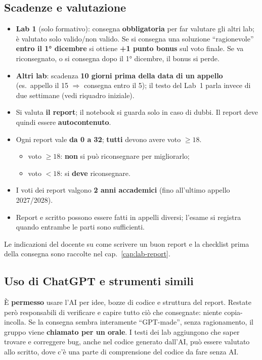 \subsection{Scadenze e valutazione}
\begin{itemize}
  \item \textbf{Lab 1} (solo formativo): consegna \textbf{obbligatoria} per far valutare gli altri lab;
        è valutato solo valido/non valido. Se si consegna una soluzione ``ragionevole''
        \textbf{entro il 1° dicembre} si ottiene \textbf{+1 punto bonus} sul voto finale.
        Se va riconsegnato, o si consegna dopo il 1° dicembre, il bonus si perde.
  \item \textbf{Altri lab}: scadenza \textbf{10 giorni prima della data di un appello} (es.\ appello
        il 15 $\Rightarrow$ consegna entro il 5); il testo del Lab~1 parla invece di due settimane
        (vedi riquadro iniziale).
  \item Si valuta \textbf{il report}; il notebook si guarda solo in caso di dubbi. Il report deve
        quindi essere \textbf{autocontenuto}.
  \item Ogni report vale \textbf{da 0 a 32}; \textbf{tutti} devono avere voto $\geq 18$.
        \begin{itemize}
          \item voto $\geq 18$: \textbf{non} si può riconsegnare per migliorarlo;
          \item voto $< 18$: si \textbf{deve} riconsegnare.
        \end{itemize}
  \item I voti dei report valgono \textbf{2 anni accademici} (fino all'ultimo appello 2027/2028).
  \item Report e scritto possono essere fatti in appelli diversi; l'esame si registra quando
        entrambe le parti sono sufficienti.
\end{itemize}

\begin{esame}
Le indicazioni del docente su come scrivere un buon report e la checklist prima della consegna sono
raccolte nel cap.~\ref{cap:lab-report}.
\end{esame}

\subsection{Uso di ChatGPT e strumenti simili}
È \textbf{permesso} usare l'AI per idee, bozze di codice e struttura del report. Restate però
responsabili di verificare e capire tutto ciò che consegnate: niente copia-incolla. Se la consegna
sembra interamente ``GPT-made'', senza ragionamento, il gruppo viene \textbf{chiamato per un orale}.
I testi dei lab aggiungono che saper trovare e correggere bug, anche nel codice generato dall'AI,
può essere valutato allo scritto, dove c'è una parte di comprensione del codice da fare senza AI.

